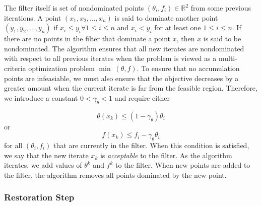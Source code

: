 \documentclass{article}
\begin{document}
The filter itself is set of nondominated points $(\theta_i, f_i) \in \mathbb {R}^2$ from some previous iterations.
A point $(x_1, x_2, \ldots, x_n)$ is said to dominate another point $(y_1, y_2, \ldots, y_n)$ if
$x_i \le y_i \forall 1\le i\le n$ and $x_i < y_i$ for at least one $ 1\le i\le n$.
If there are no points in the filter that dominate a point $x$, then $x$ is said to be nondominated.
The algorithm ensures that all new iterates are nondominated with respect to all previous iterates when the problem is viewed as a multi-criteria optimization problem $\min \; (\theta, f)$.
To ensure that no accumulation points are infeasiable, we must also ensure that the objective decreases by a greater amount when the current iterate is far from the feasible region.
Therefore, we introduce a constant $0<\gamma_{\theta}<1$ and require either

\begin{equation}
\label{acceptable1}
\theta(x_k) \le (1-\gamma_{\theta})\theta_i
\end{equation}
or
\begin{equation}
\label{acceptable2}
f(x_k) \le f_i -\gamma_{\theta}\theta_i
\end{equation}
for all $(\theta_i, f_i)$ that are currently in the filter.
When this condition is satisfied, we say that the new iterate $x_k$ is \emph{acceptable} to the filter.
As the algorithm iterates, we add values of $\theta^k$ and $f^k$ to the filter.
When new points are added to the filter, the algorithm removes all points dominated by the new point.


%
%

\subsubsection{Restoration Step}
\end{document}
